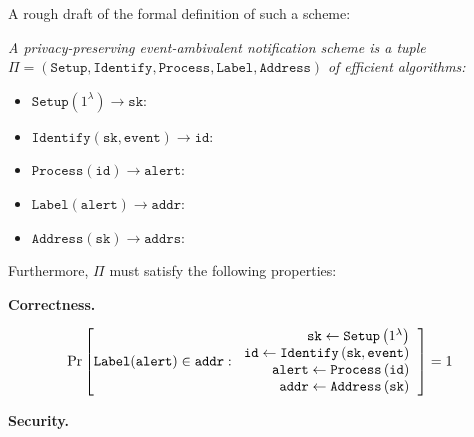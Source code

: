 A rough draft of the formal definition of such a scheme:\par

\begin{define}
\label{define:model}
  
  \emph{A privacy-preserving event-ambivalent notification scheme is a tuple}\\
  $\Pi = \mathtt{(Setup, Identify, Process, Label, Address)}$ \emph{of efficient
  algorithms:}
  
  \begin{itemize}
    
    \item $\mathtt{Setup}(1^\lambda) \to \mathtt{sk}$:

    \item $\mathtt{Identify}(\mathtt{sk, event}) \to \mathtt{id}$:

    \item $\mathtt{Process}(\mathtt{id}) \to \mathtt{alert}$:
    
    \item $\mathtt{Label}(\mathtt{alert}) \to \mathtt{addr}$:

    \item $\mathtt{Address}(\mathtt{sk}) \to \mathtt{addrs}$:
  
  \end{itemize}

\end{define}

Furthermore, $\Pi$ must satisfy the following properties:

\textbf{Correctness.}

\[
  \textrm{Pr}\left[ 
    \mathtt{Label}(\mathtt{alert}) \in \mathtt{addr} : 
    \begin{tabular}{r}
      $\mathtt{sk} \gets \mathtt{Setup}\left(1^\lambda\right)$\\
      $\mathtt{id} \gets \mathtt{Identify}\left(\mathtt{sk, event}\right)$\\
      $\mathtt{alert} \gets \mathtt{Process}\left(\mathtt{id}\right)$\\
      $\mathtt{addr} \gets \mathtt{Address}\left(\mathtt{sk}\right)$\\
    \end{tabular} 
  \right] = 1
\]

\textbf{Security.}

